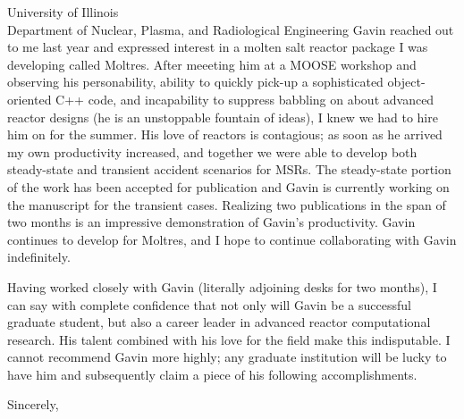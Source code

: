 \documentclass[12pt]{letter}
\begin{document}
\begin{letter}{University of Illinois\\ Department of Nuclear, Plasma, and
    Radiological Engineering}
Gavin reached out to me last year and expressed interest in a molten salt
reactor package I was developing called Moltres. After meeeting him at a MOOSE
workshop and observing his personability, ability to quickly pick-up a
sophisticated object-oriented C++ code, and incapability to suppress babbling on
about advanced reactor designs (he is an unstoppable fountain of ideas), I knew
we had to hire him on for the summer. His love of reactors is contagious; as
soon as he arrived my own productivity increased, and together we were able to
develop both steady-state and transient accident scenarios for MSRs. The
steady-state portion of the work has been accepted for publication and Gavin is
currently working on the manuscript for the transient cases. Realizing two
publications in the span of two months is an impressive demonstration of Gavin's
productivity. Gavin continues to develop for Moltres, and I hope to continue
collaborating with Gavin indefinitely.

Having worked closely with Gavin (literally adjoining desks for two months), I
can say with complete confidence that not only will Gavin be a successful
graduate student, but also a career leader in advanced reactor computational
research. His talent combined with his love for the field make this
indisputable. I cannot recommend Gavin more highly; any graduate institution
will be lucky to have him and subsequently claim a piece of his following accomplishments.

\closing{Sincerely,}
\end{letter}
\end{document}
